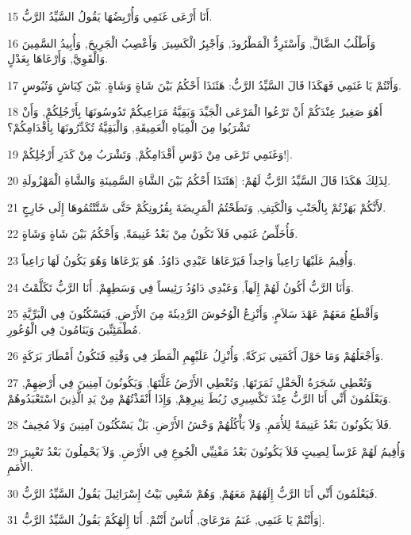 \par 15 أَنَا أَرْعَى غَنَمِي وَأُرْبِضُهَا يَقُولُ السَّيِّدُ الرَّبُّ.
\par 16 وَأَطْلُبُ الضَّالَّ, وَأَسْتَرِدُّ الْمَطْرُودَ, وَأَجْبِرُ الْكَسِيرَ, وَأَعْصِبُ الْجَرِيحَ, وَأُبِيدُ السَّمِينَ وَالْقَوِيَّ, وَأَرْعَاهَا بِعَدْلٍ.
\par 17 وَأَنْتُمْ يَا غَنَمِي فَهَكَذَا قَالَ السَّيِّدُ الرَّبُّ: هَئَنَذَا أَحْكُمُ بَيْنَ شَاةٍ وَشَاةٍ. بَيْنَ كِبَاشٍ وَتُيُوسٍ.
\par 18 أَهُوَ صَغِيرٌ عِنْدَكُمْ أَنْ تَرْعُوا الْمَرْعَى الْجَيِّدَ وَبَقِيَّةُ مَرَاعِيكُمْ تَدُوسُونَهَا بِأَرْجُلِكُمْ, وَأَنْ تَشْرَبُوا مِنَ الْمِيَاهِ الْعَمِيقَةِ, وَالْبَقِيَّةُ تُكَدِّرُونَهَا بِأَقْدَامِكُمْ؟
\par 19 وَغَنَمِي تَرْعَى مِنْ دَوْسِ أَقْدَامِكُمْ, وَتَشْرَبُ مِنْ كَدَرِ أَرْجُلِكُمْ!].
\par 20 لِذَلِكَ هَكَذَا قَالَ السَّيِّدُ الرَّبُّ لَهُمْ: [هَئَنَذَا أَحْكُمُ بَيْنَ الشَّاةِ السَّمِينَةِ وَالشَّاةِ الْمَهْزُولَةِ.
\par 21 لأَنَّكُمْ بَهَزْتُمْ بِالْجَنْبِ وَالْكَتِفِ, وَنَطَحْتُمُ الْمَرِيضَةَ بِقُرُونِكُمْ حَتَّى شَتَّتْتُمُوهَا إِلَى خَارِجٍ.
\par 22 فَأُخَلِّصُ غَنَمِي فَلاَ تَكُونُ مِنْ بَعْدُ غَنِيمَةً, وَأَحْكُمُ بَيْنَ شَاةٍ وَشَاةٍ.
\par 23 وَأُقِيمُ عَلَيْهَا رَاعِياً وَاحِداً فَيَرْعَاهَا عَبْدِي دَاوُدُ. هُوَ يَرْعَاهَا وَهُوَ يَكُونُ لَهَا رَاعِياً.
\par 24 وَأَنَا الرَّبُّ أَكُونُ لَهُمْ إِلَهاً, وَعَبْدِي دَاوُدُ رَئِيساً فِي وَسَطِهِمْ. أَنَا الرَّبُّ تَكَلَّمْتُ.
\par 25 وَأَقْطَعُ مَعَهُمْ عَهْدَ سَلاَمٍ, وَأَنْزِعُ الْوُحُوشَ الرَّدِيئَةَ مِنَ الأَرْضِ, فَيَسْكُنُونَ فِي الْبَرِّيَّةِ مُطْمَئِنِّينَ وَيَنَامُونَ فِي الْوُعُورِ.
\par 26 وَأَجْعَلُهُمْ وَمَا حَوْلَ أَكَمَتِي بَرَكَةً, وَأُنْزِلُ عَلَيْهِمِ الْمَطَرَ فِي وَقْتِهِ فَتَكُونُ أَمْطَارَ بَرَكَةٍ.
\par 27 وَتُعْطِي شَجَرَةُ الْحَقْلِ ثَمَرَتَهَا, وَتُعْطِي الأَرْضُ غَلَّتَهَا, وَيَكُونُونَ آمِنِينَ فِي أَرْضِهِمْ, وَيَعْلَمُونَ أَنِّي أَنَا الرَّبُّ عِنْدَ تَكْسِيرِي رُبُطَ نِيرِهِمْ, وَإِذَا أَنْقَذْتُهُمْ مِنْ يَدِ الَّذِينَ اسْتَعْبَدُوهُمْ.
\par 28 فَلاَ يَكُونُونَ بَعْدُ غَنِيمَةً لِلأُمَمِ, وَلاَ يَأْكُلُهُمْ وَحْشُ الأَرْضِ. بَلْ يَسْكُنُونَ آمِنِينَ وَلاَ مُخِيفٌ.
\par 29 وَأُقِيمُ لَهُمْ غَرْساً لِصِيتٍ فَلاَ يَكُونُونَ بَعْدُ مَفْنِيِّي الْجُوعِ فِي الأَرْضِ, وَلاَ يَحْمِلُونَ بَعْدُ تَعْيِيرَ الأُمَمِ.
\par 30 فَيَعْلَمُونَ أَنِّي أَنَا الرَّبُّ إِلَهُهُمْ مَعَهُمْ, وَهُمْ شَعْبِي بَيْتُ إِسْرَائِيلَ يَقُولُ السَّيِّدُ الرَّبُّ.
\par 31 وَأَنْتُمْ يَا غَنَمِي, غَنَمُ مَرْعَايَ, أُنَاسٌ أَنْتُمْ. أَنَا إِلَهُكُمْ يَقُولُ السَّيِّدُ الرَّبُّ].


